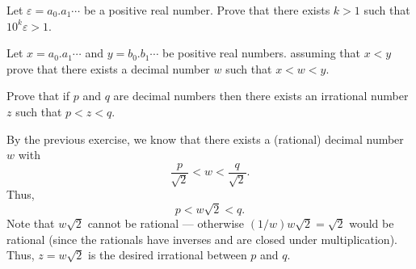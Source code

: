 \documentclass[12 pt, letterpaper]{hmcpset}
\begin{document}
\pagebreak

\begin{problem}[4.]
	Let $\varepsilon = a_{0}.a_{1} \cdots$ be a positive real number. Prove that there exists $k > 1$ such that $10^{k} \varepsilon > 1$.
\end{problem}

\pagebreak

\begin{problem}[5.]
	Let $x = a_{0}.a_{1} \cdots$ and $y = b_{0}.b_{1} \cdots$ be positive real numbers. assuming that $x < y$ prove that there exists a decimal number $w$ such that $x < w < y$.
\end{problem}

\pagebreak

\begin{problem}[6.]
	Prove that if $p$ and $q$ are decimal numbers then there exists an irrational number $z$ such that $p < z < q$.
\end{problem}

\begin{solution}
	By the previous exercise, we know that there exists a (rational) decimal number $w$ with
	\[
		\frac{p}{\sqrt{2}} < w < \frac{q}{\sqrt{2}}.
	\]
	Thus,
	\[
		p < w  \sqrt{2} < q.
	\]
	Note that $w \sqrt{2}$ cannot be rational --- otherwise $(1 / w) w \sqrt{2} = \sqrt{2}$ would be rational (since the rationals have inverses and are closed under multiplication). Thus, $z = w \sqrt{2}$ is the desired irrational between $p$ and $q$.
\end{solution}
\end{document}
